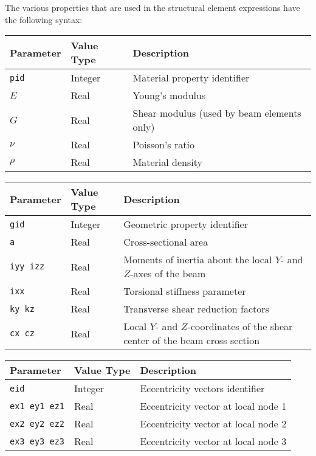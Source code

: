 
The various properties that are used in the structural element expressions
have the following syntax:


\noindent
\begin{tabular}{| m{} | m{} | m{} |}
  \hline
  \rowcolor[HTML]{EFEFEF}
  Parameter & Value Type & Description \\
  \hline\hline
  {\tt pid} & Integer & Material property identifier \\
  \hline
  {\tt $E$} & Real & Young’s modulus \\
  \hline
  {\tt $G$} & Real & Shear modulus (used by beam elements only) \\
  \hline
  $\nu$     & Real &  Poisson’s ratio \\
  \hline
  $\rho$    & Real &  Material density \\
  \hline
\end{tabular}


\noindent
\begin{tabular}{| m{} | m{} | m{} |}
  \hline
  \rowcolor[HTML]{EFEFEF}
  Parameter & Value Type & Description  \\
  \hline\hline
  {\tt gid} & Integer & Geometric property identifier \\
  \hline
  {\tt a}   & Real & Cross-sectional area \\
  \hline
  {\tt iyy izz} & Real & Moments of inertia about the local
                        $Y$- and $Z$-axes of the beam \\
  \hline
  {\tt ixx}   & Real & Torsional stiffness parameter \\
  \hline
  {\tt ky kz} & Real & Transverse shear reduction factors \\
  \hline
  {\tt cx cz} & Real & Local $Y$- and $Z$-coordinates of the shear center
                of the beam cross section \\
  \hline
\end{tabular}


\noindent
\begin{tabular}{| m{} | m{} | m{} |}
  \hline
  \rowcolor[HTML]{EFEFEF}
  Parameter   & Value Type & Description  \\
  \hline\hline
  {\tt eid}      & Integer & Eccentricity vectors identifier \\
  \hline
  {\tt ex1 ey1 ez1} & Real & Eccentricity vector at local node 1 \\
  \hline
  {\tt ex2 ey2 ez2} & Real & Eccentricity vector at local node 2 \\
  \hline
  {\tt ex3 ey3 ez3} & Real & Eccentricity vector at local node 3 \\
  \hline
\end{tabular}

